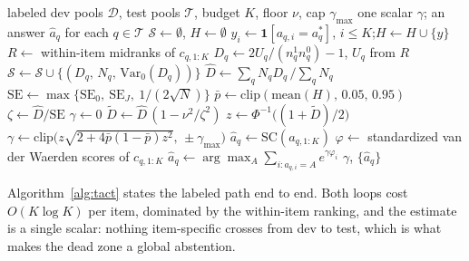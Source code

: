 \documentclass[conference]{IEEEtran}
\newcommand{\Dhat}{\widehat{D}}
\newcommand{\TACT}{\textsc{tact}}
\begin{document}
\begin{algorithm}[t]
\caption{\TACT{}: derive the exponent, then vote}
\label{alg:tact}
\begin{algorithmic}[1]
\Require labeled dev pools $\mathcal{D}$, test pools $\mathcal{T}$, budget $K$,
floor $\nu$, cap $\gamma_{\max}$
\Ensure one scalar $\gamma$; an answer $\hat a_q$ for each $q\in\mathcal{T}$
\State $\mathcal{S}\gets\emptyset$,\; $H\gets\emptyset$
  \State $y_i\gets\mathbf{1}[a_{q,i}=a^\ast_q]$,\; $i\le K$;\quad $H\gets H\cup\{y\}$
   
    \State $R\gets$ within-item midranks of $c_{q,1:K}$
    \State $D_q\gets 2U_q/(n^1_qn^0_q)-1$, \; $U_q$ from $R$
    \State $\mathcal{S}\gets\mathcal{S}\cup\{(D_q,\,N_q,\,\mathrm{Var}_0(D_q))\}$
  \EndIf
\EndFor
\State $\Dhat\gets\sum_q N_qD_q\,/\sum_q N_q$ 
\State $\mathrm{SE}\gets\max\{\mathrm{SE}_0,\ \mathrm{SE}_J,\ 1/(2\sqrt{N})\}$
\State $\bar p\gets\mathrm{clip}(\mathrm{mean}(H),\,0.05,\,0.95)$
\State $\zeta\gets\Dhat/\mathrm{SE}$
\If{$|\zeta|\le\nu$} 
  \State $\gamma\gets 0$
\Else
  \State $\tilde D\gets\Dhat\,(1-\nu^2/\zeta^2)$ 
  \State $z\gets\Phi^{-1}\big((1+\tilde D)/2\big)$
  \State $\gamma\gets\mathrm{clip}\big(z\sqrt{2+4\bar p(1-\bar p)z^2},\,\pm\gamma_{\max}\big)$
\EndIf
{}
    \State $\hat a_q\gets\mathrm{SC}(a_{q,1:K})$ 
  \Else
    \State $\varphi\gets$ standardized van der Waerden scores of $c_{q,1:K}$
    \State $\hat a_q\gets\arg\max_A\sum_{i:a_{q,i}=A}e^{\gamma\varphi_i}$
  \EndIf
\EndFor
\State \Return $\gamma$, $\{\hat a_q\}$
\end{algorithmic}
\end{algorithm}

Algorithm~\ref{alg:tact} states the labeled path end to end. Both loops cost
$O(K\log K)$ per item, dominated by the within-item ranking, and the estimate
is a single scalar: nothing item-specific crosses from dev to test, which is
what makes the dead zone a global abstention.
\end{document}
